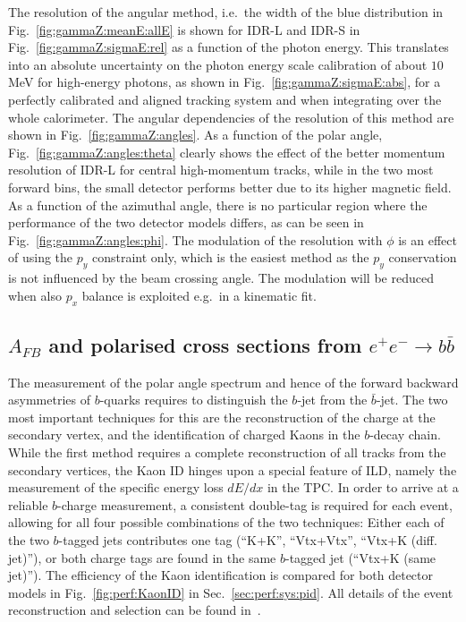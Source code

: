 The resolution of the angular method, i.e.\ the width of the blue distribution in Fig.~\ref{fig:gammaZ:meanE:allE} is shown for IDR-L and IDR-S in Fig.~\ref{fig:gammaZ:sigmaE:rel} as a function of the photon energy. This translates into
an absolute uncertainty on the photon energy scale calibration of about $10$\,MeV for high-energy photons, as shown in Fig.~\ref{fig:gammaZ:sigmaE:abs}, for a perfectly calibrated and aligned tracking system and when integrating over the whole calorimeter. 
The angular dependencies of the resolution of this method are shown in Fig.~\ref{fig:gammaZ:angles}. As a function of the polar angle, Fig.~\ref{fig:gammaZ:angles:theta} clearly shows the effect of the better momentum resolution of IDR-L for central high-momentum tracks, while in the two most forward bins, the small detector performs better due to its higher magnetic field. As a function of the azimuthal angle, there is no particular region where the performance of the two detector models differs, as can be seen in Fig.~\ref{fig:gammaZ:angles:phi}. The modulation of the resolution with $\phi$ is an effect of using the $p_y$ constraint only, which is the easiest method as the $p_y$ conservation is not influenced by the beam crossing angle. The modulation will be reduced when also $p_x$ balance is exploited e.g.\ in a kinematic fit.


\subsection{\texorpdfstring{$A_{FB}$ and polarised cross sections from $e^+e^- \to b\bar{b}$}{AFB and ALR from ee -> bb}}
\label{subsec:bench:bbbar}

The measurement of the polar angle spectrum and hence of the forward backward asymmetries of $b$-quarks requires to distinguish the $b$-jet from the $\bar{b}$-jet. The two most important techniques for this are the reconstruction of the charge at the secondary vertex, and the identification of charged Kaons in the $b$-decay chain. While the first method requires a complete reconstruction of all tracks from the secondary vertices, the Kaon ID hinges upon a special
feature of ILD, namely the measurement of the specific energy loss $dE/dx$ in the TPC. In order to arrive at a reliable $b$-charge measurement, a consistent double-tag is required for each event, allowing for all four possible combinations of the two techniques: Either each of the two $b$-tagged jets contributes one tag (``K+K'', ``Vtx+Vtx'', ``Vtx+K (diff. jet)''), or both charge tags are found in the same $b$-tagged jet (``Vtx+K (same jet)''). The efficiency of the Kaon identification is compared for both detector models in Fig.~\ref{fig:perf:KaonID} in Sec.~\ref{sec:perf:sys:pid}. All details of the event reconstruction and selection can be found in~\cite{ILDNote:bbtt}.

